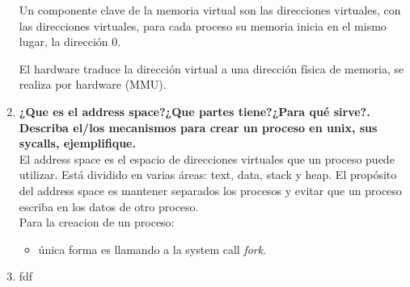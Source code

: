 \documentclass[../main.tex]{subfiles}
\begin{document}
\begin{enumerate}
                Un componente clave de la memoria virtual son las direcciones virtuales, con las direcciones virtuales, para cada proceso su memoria inicia en el mismo lugar, la dirección 0. 
                
                El hardware traduce la dirección virtual a una dirección física de memoria, se realiza por hardware (MMU).

            \item 
                \textbf{¿Que es el address space?¿Que partes tiene?¿Para qué sirve?. Describa el/los mecanismos para crear un proceso en unix, sus sycalls, ejemplifique.}\\
                El address space es el espacio de direcciones virtuales que un proceso puede utilizar.  Está dividido en varias áreas: text, data, stack y heap.
                El propósito del address space es mantener separados los procesos y evitar que un proceso escriba en los datos de otro proceso.\\
                
                Para la creacion de un proceso:
                \begin{itemize}
                    \item única forma es llamando a la system call \textit{fork}.
                \end{itemize}
            
            
            \item fdf
            
        \end{enumerate}
\end{document}
